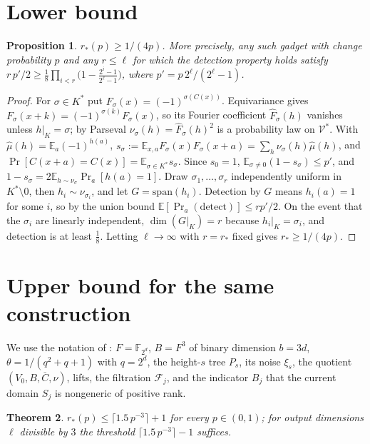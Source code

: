 \documentclass[11pt]{amsart}
\newtheorem{theorem}{Theorem}[section]
\newtheorem{proposition}[theorem]{Proposition}
\theoremstyle{remark}
\newcommand{\E}{\mathbb E}
\newcommand{\F}{\mathbb F}
\newcommand{\cV}{\mathcal V}
\begin{document}
\section{Lower bound}
\begin{proposition}\label{prop:lower}
$r_*(p)\ge1/(4p)$. More precisely, any such gadget with change probability $p$ and any
$r\le\ell$ for which the detection property holds satisfy $r\,p'/2\ge\frac18\prod_{i<r}\bigl(1-\frac{2^i-1}{2^\ell-1}\bigr)$, where $p'=p\,2^\ell/(2^\ell-1)$.
\end{proposition}
\begin{proof}
For $\sigma\in K^*$ put $F_\sigma(x)=(-1)^{\sigma(C(x))}$. Equivariance gives
$F_\sigma(x+k)=(-1)^{\sigma(k)}F_\sigma(x)$, so its Fourier coefficient $\hat F_\sigma(h)$ vanishes
unless $h|_K=\sigma$; by Parseval $\nu_\sigma(h)=\hat F_\sigma(h)^2$ is a probability law on
$\cV^*$. With $\hat\mu(h)=\E_a(-1)^{h(a)}$,
$s_\sigma:=\E_{x,a}F_\sigma(x)F_\sigma(x+a)=\sum_h\nu_\sigma(h)\hat\mu(h)$, and
$\Pr[C(x+a)=C(x)]=\E_{\sigma\in K^*}s_\sigma$. Since $s_0=1$,
$\E_{\sigma\ne0}(1-s_\sigma)\le p'$, and $1-s_\sigma=2\E_{h\sim\nu_\sigma}\Pr_a[h(a)=1]$.
Draw $\sigma_1,\dots,\sigma_r$ independently uniform in $K^*\setminus0$, then $h_i\sim\nu_{\sigma_i}$,
and let $G=\mathrm{span}(h_i)$. Detection by $G$ means $h_i(a)=1$ for some $i$, so by the union
bound $\E[\Pr_a(\text{detect})]\le rp'/2$. On the event that the $\sigma_i$ are linearly independent,
$\dim(G|_K)=r$ because $h_i|_K=\sigma_i$, and detection is at least $\frac18$. Letting
$\ell\to\infty$ with $r=r_*$ fixed gives $r_*\ge1/(4p)$.
\end{proof}

\section{Upper bound for the same construction}
We use the notation of \cite[\S3]{oai}: $F=\F_{2^d}$, $B=F^3$ of binary dimension $b=3d$,
$\theta=1/(q^2+q+1)$ with $q=2^d$, the height-$s$ tree $P_s$, its noise $\xi_s$, the quotient
$(V_0,B,\overline C,\nu)$, lifts, the filtration $\mathcal F_j$, and the indicator $B_j$ that the
current domain $S_j$ is nongeneric of positive rank.

\begin{theorem}\label{thm:upper}
$r_*(p)\le\lceil1.5\,p^{-3}\rceil+1$ for every $p\in(0,1)$; for output dimensions $\ell$ divisible
by $3$ the threshold $\lceil1.5\,p^{-3}\rceil-1$ suffices.
\end{theorem}
\end{document}
